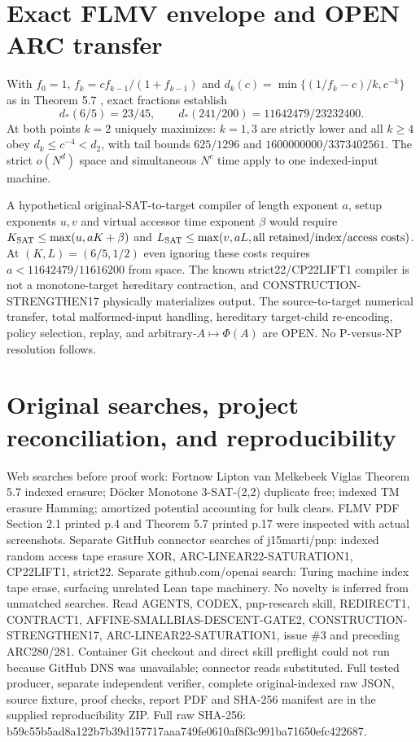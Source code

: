 \documentclass[10pt]{article}
\begin{document}
\section{Exact FLMV envelope and OPEN ARC transfer}
With $f_0=1$, $f_k=cf_{k-1}/(1+f_{k-1})$ and $d_k(c)=\min\{(1/f_k-c)/k,c^{-k}\}$ as in Theorem 5.7 \cite{flmv}, exact fractions establish
\[
d_*(6/5)=23/45,\qquad d_*(241/200)=11642479/23232400.
\]
At both points $k=2$ uniquely maximizes: $k=1,3$ are strictly lower and all $k\ge4$ obey $d_k\le c^{-4}<d_2$, with tail bounds $625/1296$ and $1600000000/3373402561$. The strict $o(N^d)$ space and simultaneous $N^c$ time apply to one indexed-input machine.

A hypothetical original-SAT-to-target compiler of length exponent $a$, setup exponents $u,v$ and virtual accessor time exponent $\beta$ would require $K_{\rm SAT}\le\max(u,aK+\beta)$ and $L_{\rm SAT}\le\max(v,aL,\text{all retained/index/access costs})$. At $(K,L)=(6/5,1/2)$ even ignoring these costs requires $a<11642479/11616200$ from space. The known strict22/CP22LIFT1 compiler is not a monotone-target hereditary contraction, and CONSTRUCTION-STRENGTHEN17 physically materializes output. The source-to-target numerical transfer, total malformed-input handling, hereditary target-child re-encoding, policy selection, replay, and arbitrary-$A\mapsto\Phi(A)$ are OPEN. No P-versus-NP resolution follows.

\section{Original searches, project reconciliation, and reproducibility}
Web searches before proof work: Fortnow Lipton van Melkebeek Viglas Theorem 5.7 indexed erasure; D\"ocker Monotone 3-SAT-(2,2) duplicate free; indexed TM erasure Hamming; amortized potential accounting for bulk clears. FLMV PDF Section 2.1 printed p.4 and Theorem 5.7 printed p.17 were inspected with actual screenshots. Separate GitHub connector searches of j15marti/pnp: indexed random access tape erasure XOR, ARC-LINEAR22-SATURATION1, CP22LIFT1, strict22. Separate github.com/openai search: Turing machine index tape erase, surfacing unrelated Lean tape machinery. No novelty is inferred from unmatched searches. Read AGENTS, CODEX, pnp-research skill, REDIRECT1, CONTRACT1, AFFINE-SMALLBIAS-DESCENT-GATE2, CONSTRUCTION-STRENGTHEN17, ARC-LINEAR22-SATURATION1, issue \#3 and preceding ARC280/281. Container Git checkout and direct skill preflight could not run because GitHub DNS was unavailable; connector reads substituted. Full tested producer, separate independent verifier, complete original-indexed raw JSON, source fixture, proof checks, report PDF and SHA-256 manifest are in the supplied reproducibility ZIP. Full raw SHA-256: b59c55b5ad8a122b7b39d157717aaa749fe0610af8f3c991ba71650efc422687.
\end{document}
